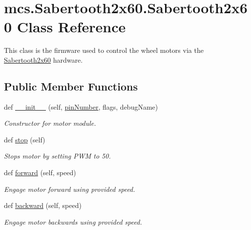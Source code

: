 \hypertarget{classmcs_1_1Sabertooth2x60_1_1Sabertooth2x60}{}\section{mcs.\+Sabertooth2x60.\+Sabertooth2x60 Class Reference}
\label{classmcs_1_1Sabertooth2x60_1_1Sabertooth2x60}


This class is the firmware used to control the wheel motors via the \hyperlink{classmcs_1_1Sabertooth2x60_1_1Sabertooth2x60}{Sabertooth2x60} hardware.  


\subsection*{Public Member Functions}
\begin{DoxyCompactItemize}
\item 
def \hyperlink{classmcs_1_1Sabertooth2x60_1_1Sabertooth2x60_a9597dc61239ea8dd6285999f7c3b8d2a}{\+\_\+\+\_\+init\+\_\+\+\_\+} (self, \hyperlink{classmcs_1_1Sabertooth2x60_1_1Sabertooth2x60_aa9937580058f87d4db9f70d3cd532760}{pin\+Number}, flags, debug\+Name)
\begin{DoxyCompactList}\small\item\em Constructor for motor module. \end{DoxyCompactList}\item 
def \hyperlink{classmcs_1_1Sabertooth2x60_1_1Sabertooth2x60_aef280facf9a0289a38b12075f4e66440}{stop} (self)
\begin{DoxyCompactList}\small\item\em Stops motor by setting P\+WM to 50. \end{DoxyCompactList}\item 
def \hyperlink{classmcs_1_1Sabertooth2x60_1_1Sabertooth2x60_ace6e29789475ce51e75dce8ef5fec1d6}{forward} (self, speed)
\begin{DoxyCompactList}\small\item\em Engage motor forward using provided speed. \end{DoxyCompactList}\item 
def \hyperlink{classmcs_1_1Sabertooth2x60_1_1Sabertooth2x60_afc1a0f66cf719a718910239cfca0cfda}{backward} (self, speed)
\begin{DoxyCompactList}\small\item\em Engage motor backwards using provided speed. \end{DoxyCompactList}\end{DoxyCompactItemize}
